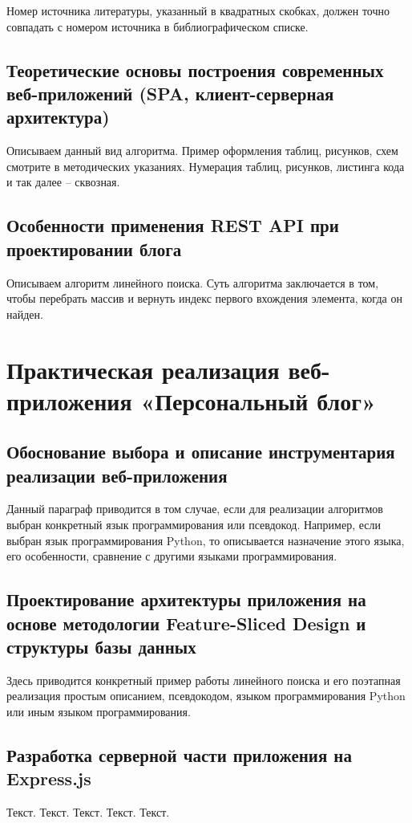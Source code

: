 \documentclass[a4paper,14pt]{extarticle}
\begin{document}
Номер источника литературы, указанный в квадратных скобках, должен точно совпадать с номером источника в библиографическом списке.

\subsection{Теоретические основы построения современных веб-приложений (SPA, клиент-серверная архитектура)}
Описываем данный вид алгоритма. Пример оформления таблиц, рисунков, схем смотрите в методических указаниях. Нумерация таблиц, рисунков, листинга кода и так далее – сквозная.

\subsection{Особенности применения REST API при проектировании блога}
Описываем алгоритм линейного поиска. Суть алгоритма заключается в том, чтобы перебрать массив и вернуть индекс первого вхождения элемента, когда он найден.

\newpage
\section{Практическая реализация веб-приложения «Персональный блог»}

\subsection{Обоснование выбора и описание инструментария реализации веб-приложения}
Данный параграф приводится в том случае, если для реализации алгоритмов выбран конкретный язык программирования или псевдокод. Например, если выбран язык программирования Python, то описывается назначение этого языка, его особенности, сравнение с другими языками программирования.

\subsection{Проектирование архитектуры приложения на основе методологии Feature-Sliced Design и структуры базы данных}
Здесь приводится конкретный пример работы линейного поиска и его поэтапная реализация простым описанием, псевдокодом, языком программирования Python или иным языком программирования.

\subsection{Разработка серверной части приложения на Express.js}
Текст. Текст. Текст. Текст. Текст.
\end{document}
